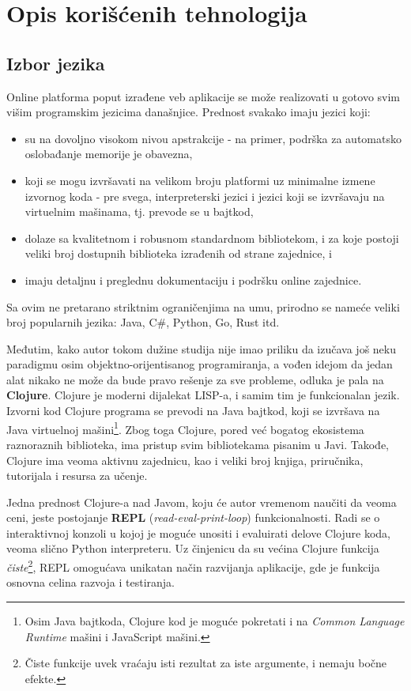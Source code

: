 
\section{Opis korišćenih tehnologija}
\subsection{Izbor jezika}
Online platforma poput izrađene veb aplikacije se može realizovati u gotovo svim višim programskim jezicima današnjice. Prednost svakako imaju jezici koji:
\begin{itemize}
\renewcommand\labelitemi{--}
\item su na dovoljno visokom nivou apstrakcije - na primer, podrška za automatsko oslobađanje memorije je obavezna,
\item koji se mogu izvršavati na velikom broju platformi uz minimalne izmene izvornog koda - pre svega, interpreterski jezici i jezici koji se izvršavaju na virtuelnim mašinama, tj. prevode se u bajtkod,
\item dolaze sa kvalitetnom i robusnom standardnom bibliotekom, i za koje postoji veliki broj dostupnih biblioteka izrađenih od strane zajednice, i
\item imaju detaljnu i preglednu dokumentaciju i podršku online zajednice.
\end{itemize}
Sa ovim ne pretarano striktnim ograničenjima na umu, prirodno se nameće veliki broj popularnih jezika: Java, C\#, Python, Go, Rust itd.

Međutim, kako autor tokom dužine studija nije imao priliku da izučava još neku paradigmu osim objektno-orijentisanog programiranja, a vođen idejom da jedan alat nikako ne može da bude pravo rešenje za sve probleme, odluka je pala na \textbf{Clojure}. Clojure je moderni dijalekat LISP-a, i samim tim je funkcionalan jezik. Izvorni kod Clojure programa se prevodi na Java bajtkod, koji se izvršava na Java virtuelnoj mašini\footnote{Osim Java bajtkoda, Clojure kod je moguće pokretati i na \textit{Common Language Runtime} mašini i JavaScript mašini.}. Zbog toga Clojure, pored već bogatog ekosistema raznoraznih biblioteka, ima pristup svim bibliotekama pisanim u Javi. Takođe, Clojure ima veoma aktivnu zajednicu, kao i veliki broj knjiga\cite{Emerick:2012:CP}\cite{Higginbotham:2015:CBT}, priručnika, tutorijala i resursa za učenje.

Jedna prednost Clojure-a nad Javom, koju će autor vremenom naučiti da veoma ceni, jeste postojanje \textbf{REPL} (\textit{read-eval-print-loop}) funkcionalnosti. Radi se o interaktivnoj konzoli u kojoj je moguće unositi i evaluirati delove Clojure koda, veoma slično Python interpreteru. Uz činjenicu da su većina Clojure funkcija \emph{čiste}\footnote{Čiste funkcije uvek vraćaju isti rezultat za iste argumente, i nemaju bočne efekte.}, REPL omogućava unikatan način razvijanja aplikacije, gde je funkcija osnovna celina razvoja i testiranja.

